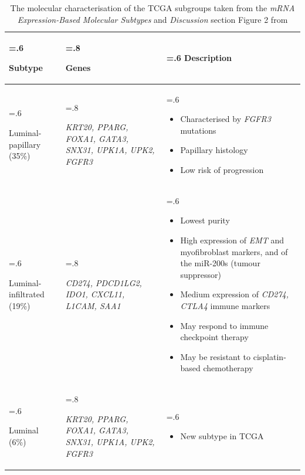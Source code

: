 \begin{table}[htbp]
\centering
\caption{The molecular characterisation of the TCGA subgroups taken from the \textit{mRNA Expression-Based Molecular Subtypes} and \textit{Discussion} section Figure 2 from \citet{Robertson2017-mg}}
    \begin{tabularx}{\textwidth}{
      >{\hsize=.6\hsize\raggedright\arraybackslash}X
      >{\hsize=.8\hsize\raggedright\arraybackslash}X
      >{\hsize=.6\hsize\arraybackslash}X
    }
    \toprule
    Subtype & Genes & Description \\
    \midrule
    Luminal-papillary (35\%) & \textit{KRT20, PPARG, FOXA1, GATA3, SNX31, UPK1A, UPK2, FGFR3} & 
    \begin{itemize}[leftmargin=*, nosep, after=\vspace{-\baselineskip}, before=\vspace{-.6\baselineskip}]
        \item Characterised by \textit{FGFR3} mutations
        \item Papillary histology
        \item Low risk of progression
    \end{itemize} \\
    \midrule
    Luminal-infiltrated (19\%) & \textit{CD274, PDCD1LG2, IDO1, CXCL11, L1CAM, SAA1} & 
    \begin{itemize}[leftmargin=*, nosep, after=\vspace{-\baselineskip}, before=\vspace{-.6\baselineskip}]
        \item Lowest purity
        \item High expression of \textit{EMT} and myofibroblast markers, and of the miR-200s (tumour suppressor)
        \item Medium expression of \textit{CD274, CTLA4} immune markers
        \item May respond to immune checkpoint therapy
        \item May be resistant to cisplatin-based chemotherapy
    \end{itemize} \\
    \midrule
    Luminal (6\%) & \textit{KRT20, PPARG, FOXA1, GATA3, SNX31, UPK1A, UPK2, FGFR3} & 
    \begin{itemize}[leftmargin=*, nosep, after=\vspace{-\baselineskip}, before=\vspace{-.6\baselineskip}]
        \item New subtype in TCGA

\end{itemize}
\end{tabularx}
\end{table}

